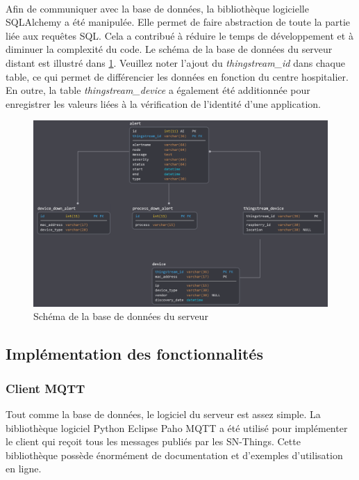 ~

\noindent
Afin de communiquer avec la base de données, la bibliothèque logicielle SQLAlchemy a été manipulée. Elle permet de faire abstraction de toute la partie liée aux requêtes SQL. Cela a contribué à réduire le temps de développement et à diminuer la complexité du code. Le schéma de la base de données du serveur distant est illustré dans \ref{fig:server_db_schema}. Veuillez noter l'ajout du \textit{thingstream\_id} dans chaque table, ce qui permet de différencier les données en fonction du centre hospitalier. En outre, la table \textit{thingstream\_device} a également été additionnée pour enregistrer les valeurs liées à la vérification de l'identité d'une application.


\begin{figure}[ht!]
  \includegraphics[width=\textwidth]{img/app/db_final.png}
  \caption{Schéma de la base de données du serveur}
  \label{fig:server_db_schema}
\end{figure}


\subsection{Implémentation des fonctionnalités}

\subsubsection{Client MQTT}

\noindent
Tout comme la base de données, le logiciel du serveur est assez simple. La bibliothèque logiciel Python Eclipse Paho MQTT a été utilisé pour implémenter le client qui reçoit tous les messages publiés par les SN-Things. Cette bibliothèque possède énormément de documentation et d'exemples d'utilisation en ligne.

